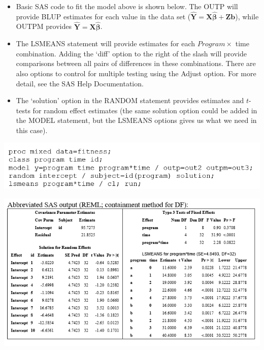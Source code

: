 \documentclass[
  9pt,
  ignorenonframetext,
]{beamer}
\begin{document}
\begin{frame}{}
\protect\hypertarget{section-8}{}
\begin{itemize}
\item
  Basic SAS code to fit the model above is shown below. The OUTP will
  provide BLUP estimates for each value in the data set
  (\(\pmb {\hat Y=X \hat \beta + Zb}\)), while OUTPM provides
  \(\pmb {\hat Y= X \hat \beta}\).
\item
  The LSMEANS statement will provide estimates for each
  \(Program \times\) time combination. Adding the `diff' option to the
  right of the slash will provide comparisons between all pairs of
  differences in these combinations. There are also options to control
  for multiple testing using the Adjust option. For more detail, see the
  SAS Help Documentation.
\item
  The `solution' option in the RANDOM statement provides estimates and
  \(t\)-tests for random effect estimates (the same solution option
  could be added in the MODEL statement, but the LSMEANS options gives
  us what we need in this case).
\end{itemize}
\end{frame}

\begin{frame}{}
\protect\hypertarget{section-9}{}
\includegraphics[width=1\linewidth]{figs_L4/f3}

\includegraphics[width=1\linewidth]{figs_L4/f4}
\end{frame}
\end{document}
